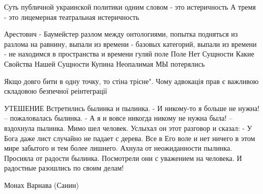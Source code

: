 Суть публичной украинской политики одним словом - это истеричность
А тремя - это лицемерная театральная истеричность

Арестович - Баумейстер
	разлом между онтологиями, попытка подняться из разлома на равнину,
	выпали из времени - базовых категорий,
	выпали из времени - не находимся в пространства и времени
	гуляй поле Поле
	Нет Сущности
	Какие Свойства Нашей Сущности
	Купина Неопалимая
	МЫ потерялись

Якщо довго бити в одну точку, то стіна трісне". Чому адвокація прав є важливою складовою безпечної реінтеграції 

УТЕШЕНИЕ
 Встретились былинка и пылинка.
 - И никому-то я больше не нужна! – пожаловалась былинка.
 - А я и вовсе никогда никому не нужна была! – вздохнула пылинка.
 Мимо шел человек.
 Услыхал он этот разговор и сказал:
 - У Бога даже лист случайно не падает с дерева. Все в Его воле и нет ничего в этом мире забытого и тем более лишнего.
 Ахнула от неожиданности пылинка.
 Просияла от радости былинка.
 Посмотрели они с уважением на человека.
 И радостные разошлись по своим делам!

Монах Варнава (Санин)

